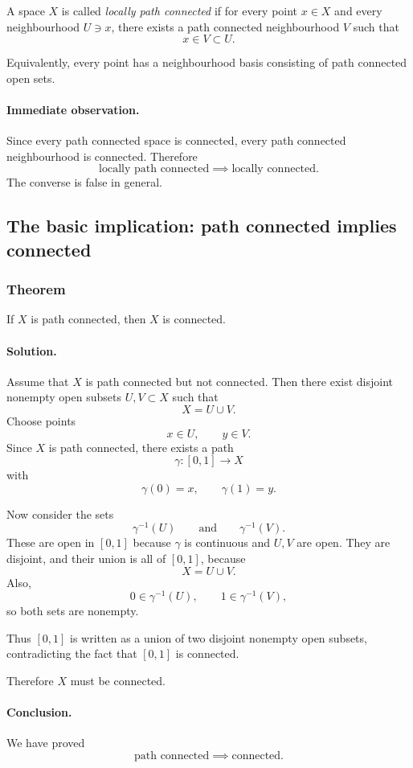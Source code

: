 \documentclass[12pt,a4paper]{article}
\theoremstyle{notespace}
\begin{document}
A space \(X\) is called \emph{locally path connected} if for every point \(x\in X\) and every neighbourhood \(U\ni x\), there exists a path connected neighbourhood \(V\) such that
\[
x\in V\subset U.
\]

Equivalently, every point has a neighbourhood basis consisting of path connected open sets.

\paragraph{Immediate observation.}
Since every path connected space is connected, every path connected neighbourhood is connected. Therefore
\[
\text{locally path connected} \implies \text{locally connected}.
\]
The converse is false in general.

\subsection{The basic implication: path connected implies connected}

\subsubsection{Theorem}

If \(X\) is path connected, then \(X\) is connected.

\paragraph{\textbf{Solution.}}
Assume that \(X\) is path connected but not connected. Then there exist disjoint nonempty open subsets \(U,V\subset X\) such that
\[
X=U\cup V.
\]
Choose points
\[
x\in U,
\qquad
y\in V.
\]
Since \(X\) is path connected, there exists a path
\[
\gamma:[0,1]\to X
\]
with
\[
\gamma(0)=x,
\qquad
\gamma(1)=y.
\]

Now consider the sets
\[
\gamma^{-1}(U)
\qquad\text{and}\qquad
\gamma^{-1}(V).
\]
These are open in \([0,1]\) because \(\gamma\) is continuous and \(U,V\) are open. They are disjoint, and their union is all of \([0,1]\), because
\[
X=U\cup V.
\]
Also,
\[
0\in \gamma^{-1}(U),
\qquad
1\in \gamma^{-1}(V),
\]
so both sets are nonempty.

Thus \([0,1]\) is written as a union of two disjoint nonempty open subsets, contradicting the fact that \([0,1]\) is connected.

Therefore \(X\) must be connected.

\paragraph{Conclusion.}
We have proved
\[
\text{path connected} \implies \text{connected}.
\]
\end{document}
